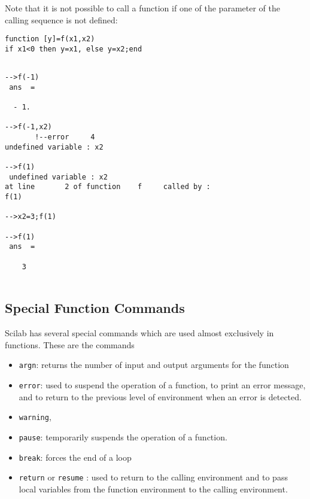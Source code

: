 Note that it is not possible to call a function if one of the
parameter of the calling sequence is not defined:

\begin{verbatim}
function [y]=f(x1,x2)
if x1<0 then y=x1, else y=x2;end

\end{verbatim}
\begin{verbatim}

-->f(-1)
 ans  =
 
  - 1.  
 
-->f(-1,x2)
       !--error     4 
undefined variable : x2  

-->f(1)
 undefined variable : x2                      
at line       2 of function    f     called by :  
f(1)

-->x2=3;f(1)

-->f(1)
 ans  =
 
    3
                    
\end{verbatim}



\subsection{Special Function Commands}
Scilab has several special commands which are used almost exclusively
in functions.  These are the commands 

\begin{itemize}
	\item {\tt argn}: returns the number of input
and output arguments for the function
	\item {\tt error}: used to suspend the 
operation of a function, to print an error message, and to return to the
previous level of environment when an error is detected.  
	\item {\tt warning}, 
	\item {\tt pause}: temporarily suspends the 
operation of a function.
	\item {\tt break}: forces the end of a loop 
	\item {\tt return} or {\tt resume} : used 
to return to the calling environment and to pass local
variables from the function environment to the calling environment.  
\end{itemize}

